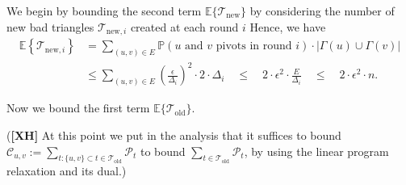 \documentclass{article} %
\newcommand{\xh}[1]{{\color{red}({\bf [XH]} #1)}}
\renewcommand{\Pr}{\mathbb{P}}
\begin{document}
We begin by bounding the second term $\mathbb{E}\{\mathcal{T}_{\text{new}}\}$ by considering the number of new bad triangles $\mathcal{T}_{\text{new},i}$ created at each round $i$
Hence, we have
\begin{align*}
\mathbb{E}\left\{\mathcal{T}_{\text{new},i}\right\}
&=   \sum_{(u,v) \in E} \Pr(\text{$u$ and $v$ pivots in round $i$}) \cdot |\Gamma(u) \cup \Gamma(v)| \\
&\le \sum_{(u,v) \in E} \left(\frac{\epsilon}{\Delta_i}\right)^2 \cdot 2 \cdot \Delta_i
\quad\le\quad 2\cdot \epsilon^2\cdot \frac{E}{\Delta_i}
\quad\le\quad 2\cdot \epsilon^2 \cdot n.
\end{align*}

Now we bound the first term $\mathbb{E}\{\mathcal{T}_\text{old}\}$.

\xh{At this point we put in the analysis that it suffices to bound $\mathcal{C}_{u,v} := \sum_{t:\{u,v\}\subset t \in \mathcal{T}_\text{old}} \mathcal{P}_t$ to bound $\sum_{t \in \mathcal{T}_{\text{old}}} \mathcal{P}_t$, by using the linear program relaxation and its dual.}
\end{document}
